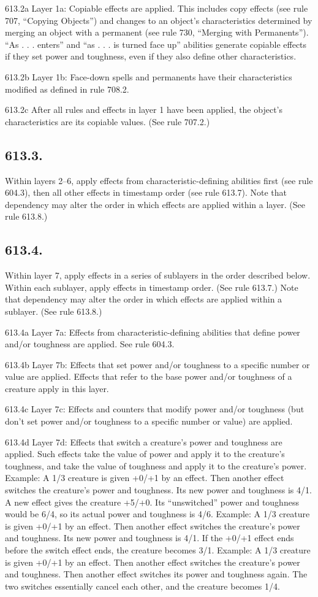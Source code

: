 613.2a Layer 1a: Copiable effects are applied. This includes copy effects (see rule 707, “Copying Objects”) and changes to an object’s characteristics determined by merging an object with a permanent (see rule 730, “Merging with Permanents”). “As . . . enters” and “as . . . is turned face up” abilities generate copiable effects if they set power and toughness, even if they also define other characteristics.

613.2b Layer 1b: Face-down spells and permanents have their characteristics modified as defined in rule 708.2.

613.2c After all rules and effects in layer 1 have been applied, the object’s characteristics are its copiable values. (See rule 707.2.)

\subsection*{613.3.}
Within layers 2–6, apply effects from characteristic-defining abilities first (see rule 604.3), then all other effects in timestamp order (see rule 613.7). Note that dependency may alter the order in which effects are applied within a layer. (See rule 613.8.)

\subsection*{613.4.}
Within layer 7, apply effects in a series of sublayers in the order described below. Within each sublayer, apply effects in timestamp order. (See rule 613.7.) Note that dependency may alter the order in which effects are applied within a sublayer. (See rule 613.8.)

613.4a Layer 7a: Effects from characteristic-defining abilities that define power and/or toughness are applied. See rule 604.3.

613.4b Layer 7b: Effects that set power and/or toughness to a specific number or value are applied. Effects that refer to the base power and/or toughness of a creature apply in this layer.

613.4c Layer 7c: Effects and counters that modify power and/or toughness (but don’t set power and/or toughness to a specific number or value) are applied.

613.4d Layer 7d: Effects that switch a creature’s power and toughness are applied. Such effects take the value of power and apply it to the creature’s toughness, and take the value of toughness and apply it to the creature’s power.
Example: A 1/3 creature is given +0/+1 by an effect. Then another effect switches the creature’s power and toughness. Its new power and toughness is 4/1. A new effect gives the creature +5/+0. Its “unswitched” power and toughness would be 6/4, so its actual power and toughness is 4/6.
Example: A 1/3 creature is given +0/+1 by an effect. Then another effect switches the creature’s power and toughness. Its new power and toughness is 4/1. If the +0/+1 effect ends before the switch effect ends, the creature becomes 3/1.
Example: A 1/3 creature is given +0/+1 by an effect. Then another effect switches the creature’s power and toughness. Then another effect switches its power and toughness again. The two switches essentially cancel each other, and the creature becomes 1/4.

